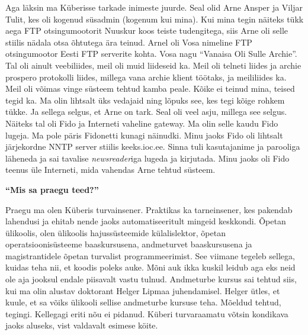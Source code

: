 Aga läksin ma Küberisse tarkade inimeste juurde. Seal olid Arne
Ansper ja Viljar Tulit, kes oli kogenud süsadmin
(kogenum kui mina). Kui mina tegin näiteks tükk aega FTP otsingumootorit
Nuuskur koos teiste tudengitega, siis Arne oli selle stiilis
nädala otsa õhtutega ära teinud. Arnel oli Vosa nimeline FTP
otsingumootor Eesti FTP serverite kohta. Vosa nagu \enquote{Vanaisa Oli Sulle
Archie}. Tal oli ainult veebiliides, meil oli
muid liideseid ka. Meil oli telneti liides ja archie prospero
protokolli liides, millega
vana archie klient töötaks, ja meililiides ka. Meil oli võimas vinge süsteem
tehtud kamba peale. Kõike ei teinud mina, teised tegid ka. Ma olin lihtsalt üks
vedajaid ning lõpuks see, kes tegi kõige rohkem tükke. Ja sellega selgus, et
Arne on tark. Seal oli veel asju, millega see selgus. Näiteks tal oli Fido ja
Interneti vaheline gateway. Ma olin selle kaudu
Fido lugeja. Ma pole päris Fidonetti kunagi
näinudki. Minu jaoks Fido oli lihtsalt järjekordne
NNTP server stiilis
keeks.ioc.ee. Sinna tuli kasutajanime ja parooliga
läheneda ja sai tavalise \emph{newsreader}iga lugeda ja kirjutada. Minu jaoks
oli Fido teenus üle Interneti, mida vahendas Arne tehtud süsteem.

\textbf{\enquote{Mis sa praegu teed?}}

Praegu ma olen Küberis turvainsener. Praktikas ka
tarneinsener, kes pakendab lahendusi ja ehitab nende jaoks automatiseeritult
mingeid keskkondi.  Õpetan ülikoolis, olen ülikoolis
hajussüsteemide külalislektor, õpetan operatsioonisüsteeme baaskursusena,
andmeturvet baaskursusena ja magistrantidele õpetan turvalist programmeerimist.
See viimane tegeleb sellega, kuidas teha nii, et koodis poleks auke. Mõni auk
ikka kuskil leidub aga eks neid ole aja jooksul endale piisavalt vastu tulnud.
Andmeturbe kursus sai tehtud siis, kui ma olin alustav doktorant Helger
Lipmaa juhendamisel. Helger ütles, et kuule, et sa
võiks ülikooli sellise andmeturbe kursuse teha. Mõeldud tehtud, tegingi.
Kellegagi eriti nõu ei pidanud. Küberi turvaraamatu võtsin kondikava jaoks aluseks,
vist valdavalt esimese köite.


